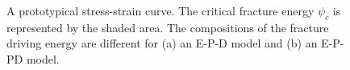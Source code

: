 \begin{figure}[htb!]
\begin{subfigure}{0.4\textwidth}
    \caption{}
    \label{fig: Chapter5/terminology/EPPD}
  \end{subfigure}
  \caption[A prototypical stress-strain curve.]{A prototypical stress-strain curve. The critical fracture energy $\psi_c$ is represented by the shaded area. The compositions of the fracture driving energy are different for (a) an E-P-D model and (b) an E-P-PD model.}
  \label{fig: Chapter5/terminology}
\end{figure}
